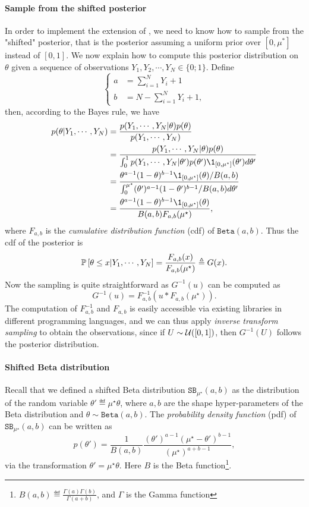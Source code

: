 \paragraph{Sample from the shifted posterior}
In order to implement the extension of \DTTTS, we need to know how to sample from the "shifted" posterior, that is the posterior assuming a uniform prior over $[0,\mu^*]$ instead of $[0,1]$. We now explain how to compute this posterior distribution on $\theta$ given a sequence of observations $Y_1,Y_2,\cdots,Y_N\in\{0;1\}$. Define
\[
    \left\{
    \begin{array}{ll}
        a &= \sum_{i=1}^N Y_i + 1 \\
        b &= N - \sum_{i=1}^N Y_i + 1,
    \end{array}
    \right.
\]
then, according to the Bayes rule, we have
\begin{align*}
    p(\theta|Y_1,\cdots,Y_N) &= \frac{p(Y_1,\cdots,Y_N|\theta)p(\theta)}{p(Y_1,\cdots,Y_N)} \\
                             &= \frac{p(Y_1,\cdots,Y_N|\theta)p(\theta)}{\int_0^1 p(Y_1,\cdots,Y_N|\theta')p(\theta')\1_{[0,\mu^\star]}(\theta')d\theta'} \\
                             &= \frac{\theta^{a-1}(1-\theta)^{b-1}\1_{[0,\mu^\star]}(\theta) / B(a,b)}{\int_{0}^{\mu^\star}(\theta')^{a-1}(1-\theta')^{b-1} / B(a,b) d\theta'} \\
                             &= \frac{\theta^{a-1}(1-\theta)^{b-1}\1_{[0,\mu^\star]}(\theta)}{B(a,b)F_{a,b}(\mu^\star)},
\end{align*}
where $F_{a,b}$ is the \emph{cumulative distribution function} (cdf) of $\texttt{Beta}(a,b)$. Thus the cdf of the posterior is
\[
    \mathbb{P}\left[\theta\leq x | Y_1,\cdots,Y_N\right] = \frac{F_{a,b}(x)}{F_{a,b}(\mu^\star)} \triangleq G(x).
\]
Now the sampling is quite straightforward as $G^{-1}(u)$ can be computed as
\[
    G^{-1}(u) = F_{a,b}^{-1} (u * F_{a,b}(\mu^\star)).
\]
The computation of $F_{a,b}^{-1}$ and $F_{a,b}$ is easily accessible via existing libraries in different programming languages, and we can thus apply \emph{inverse transform sampling} to obtain the observations, since if $U \sim \mathcal{U}([0,1])$, then $G^{-1}(U)$ follows the posterior distribution.

\paragraph{Shifted Beta distribution}
Recall that we defined a shifted Beta distribution $\texttt{SB}_{\mu^\star}(a,b)$ as the distribution of the random variable $\theta' \eqdef \mu^\star \theta$, where $a, b$ are the shape hyper-parameters of the Beta distribution and $\theta \sim \texttt{Beta}(a,b)$. The \emph{probability density function} (pdf) of $\texttt{SB}_{\mu^\star}(a,b)$ can be written as
\[
    p(\theta') = \frac{1}{B(a,b)} \frac{(\theta')^{a-1}(\mu^\star-\theta')^{b-1}}{(\mu^\star)^{a+b-1}},
\]
via the transformation $\theta' = \mu^\star\theta$. Here $B$ is the Beta function\footnote{$B(a,b)\eqdef\frac{\Gamma(a)\Gamma(b)}{\Gamma(a+b)}$, and $\Gamma$ is the Gamma function}.

